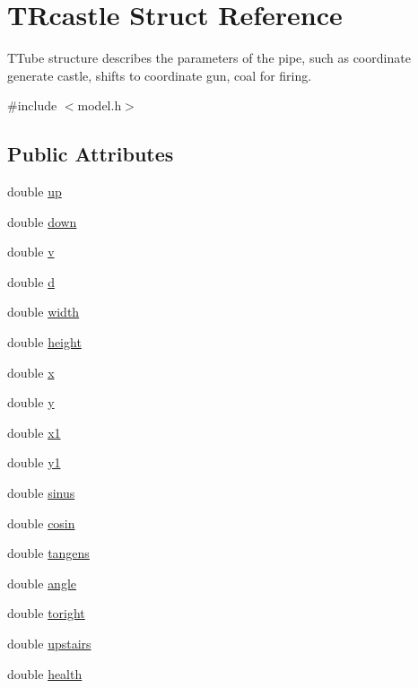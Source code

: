 \hypertarget{struct_t_rcastle}{}\section{T\+Rcastle Struct Reference}
\label{struct_t_rcastle}


T\+Tube structure describes the parameters of the pipe, such as coordinate generate castle, shifts to coordinate gun, coal for firing.  




{\ttfamily \#include $<$model.\+h$>$}

\subsection*{Public Attributes}
\begin{DoxyCompactItemize}
\item 
double \hyperlink{struct_t_rcastle_a8795b22682121b2d98aa10ecbcc5c950}{up}
\item 
double \hyperlink{struct_t_rcastle_a6256c708f2b3e4114c0ebab3f388aede}{down}
\item 
double \hyperlink{struct_t_rcastle_a35cd1c80d382fcf153c8ce5a55676642}{v}
\item 
double \hyperlink{struct_t_rcastle_adaf3bf8d36b2d4115959858737f4d277}{d}
\item 
double \hyperlink{struct_t_rcastle_a070133588b3ceb37881590fc42f6a3d1}{width}
\item 
double \hyperlink{struct_t_rcastle_a8233f9c16ee4b0e9c53dc5da5ab0ade3}{height}
\item 
double \hyperlink{struct_t_rcastle_abda3f6ca289399c054e4c5eda9651122}{x}
\item 
double \hyperlink{struct_t_rcastle_a04e7abedc910e08ebf0fecac129d96c7}{y}
\item 
double \hyperlink{struct_t_rcastle_a2284c30dfba99adf368dfa5a2f3b7bed}{x1}
\item 
double \hyperlink{struct_t_rcastle_a560becdf5bd4c0ce143f3490ebefc341}{y1}
\item 
double \hyperlink{struct_t_rcastle_ad2ee1171abe396daebffa0cf94f523fb}{sinus}
\item 
double \hyperlink{struct_t_rcastle_ad7002df0e24f1d7d6c36240ea4aac2a2}{cosin}
\item 
double \hyperlink{struct_t_rcastle_a56ecb2585e6581b242f29f3594df7273}{tangens}
\item 
double \hyperlink{struct_t_rcastle_a2fd7be705bdd092f15e434666d793329}{angle}
\item 
double \hyperlink{struct_t_rcastle_a67bda138dc3c05550da282dcabd223ba}{toright}
\item 
double \hyperlink{struct_t_rcastle_a4dd235ff59de5a9a4c3d9632a87ad9bf}{upstairs}
\item 
double \hyperlink{struct_t_rcastle_a8fc2c90a8127bac5ea539f14d6da4850}{health}
\end{DoxyCompactItemize}


